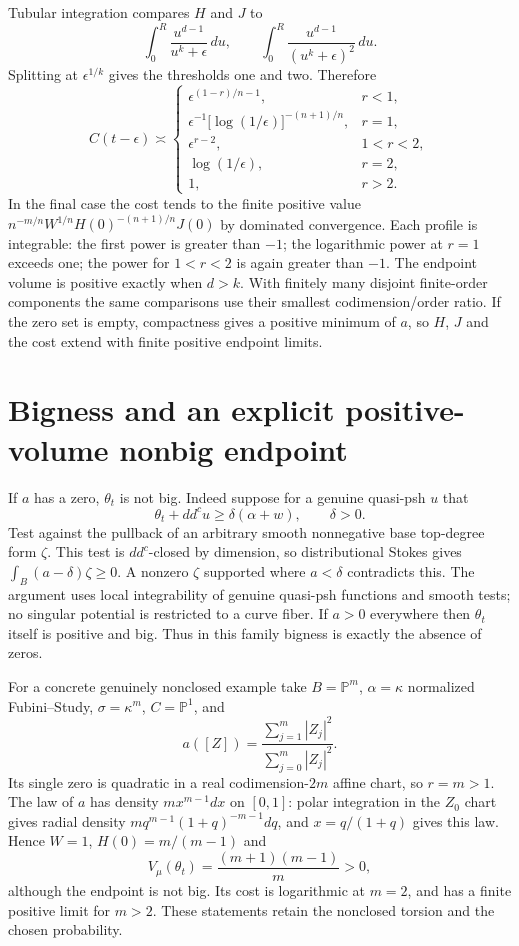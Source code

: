 \documentclass[11pt]{article}
\newcommand{\ddc}{dd^c}
\theoremstyle{remark}\newtheorem{remark}[theorem]{Remark}
\begin{document}
Tubular integration compares $H$ and $J$ to
\[
 \int_0^R\frac{u^{d-1}}{u^k+\epsilon}\,du,
 \qquad \int_0^R\frac{u^{d-1}}{(u^k+\epsilon)^2}\,du.
\]
Splitting at $\epsilon^{1/k}$ gives the thresholds one and two. Therefore
\begin{equation}\label{eq:profiles}
 C(t-\epsilon)\asymp
 \begin{cases}
 \epsilon^{(1-r)/n-1},&r<1,\\
 \epsilon^{-1}\bigl[\log(1/\epsilon)\bigr]^{-(n+1)/n},&r=1,\\
 \epsilon^{r-2},&1<r<2,\\
 \log(1/\epsilon),&r=2,\\
 1,&r>2.
 \end{cases}
\end{equation}
In the final case the cost tends to the finite positive value
$n^{-m/n}W^{1/n}H(0)^{-(n+1)/n}J(0)$ by dominated convergence.
Each profile is integrable: the first power is greater than $-1$;
the logarithmic power at $r=1$ exceeds one; the power for $1<r<2$
is again greater than $-1$. The endpoint volume is positive exactly
when $d>k$. With finitely many disjoint finite-order components the
same comparisons use their smallest codimension/order ratio.
If the zero set is empty, compactness gives a positive minimum of $a$,
so $H$, $J$ and the cost extend with finite positive endpoint limits.

\section{Bigness and an explicit positive-volume nonbig endpoint}
If $a$ has a zero, $\theta_t$ is not big. Indeed suppose for a genuine
quasi-psh $u$ that
\[
 \theta_t+\ddc u\geq\delta(\alpha+w),\qquad\delta>0.
\]
Test against the pullback of an arbitrary smooth nonnegative base
top-degree form $\zeta$. This test is $\ddc$-closed by dimension, so
distributional Stokes gives
$\int_B(a-\delta)\zeta\geq0$.
A nonzero $\zeta$ supported where $a<\delta$ contradicts this.
The argument uses local integrability of genuine quasi-psh functions
and smooth tests; no singular potential is restricted to a curve fiber.
If $a>0$ everywhere then $\theta_t$ itself is positive and big.
Thus in this family bigness is exactly the absence of zeros.

For a concrete genuinely nonclosed example take $B=\mathbb P^m$,
$\alpha=\kappa$ normalized Fubini--Study, $\sigma=\kappa^m$,
$C=\mathbb P^1$, and
\[
 a([Z])=\frac{\sum_{j=1}^m|Z_j|^2}{\sum_{j=0}^m|Z_j|^2}.
\]
Its single zero is quadratic in a real codimension-$2m$ affine chart,
so $r=m>1$. The law of $a$ has density $m x^{m-1}dx$ on $[0,1]$:
polar integration in the $Z_0$ chart gives radial density
$m q^{m-1}(1+q)^{-m-1}dq$, and $x=q/(1+q)$ gives this law.
Hence $W=1$, $H(0)=m/(m-1)$ and
\[
 V_\mu(\theta_t)=\frac{(m+1)(m-1)}m>0,
\]
although the endpoint is not big. Its cost is logarithmic at $m=2$,
and has a finite positive limit for $m>2$.
These statements retain the nonclosed torsion and the chosen probability.
\end{document}
